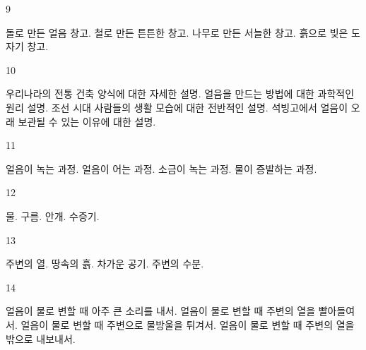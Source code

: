 \documentclass[fs9,seriesFre]{korfarm-base}
\begin{document}
\begin{kfSentenceUnit}{9}{}
\begin{kfChoices}
\kfChoice 돌로 만든 얼음 창고.
\kfChoice 철로 만든 튼튼한 창고.
\kfChoice 나무로 만든 서늘한 창고.
\kfChoice 흙으로 빚은 도자기 창고.
\end{kfChoices}
\end{kfSentenceUnit}

\begin{kfSentenceUnit}{10}{}
\begin{kfChoices}
\kfChoice 우리나라의 전통 건축 양식에 대한 자세한 설명.
\kfChoice 얼음을 만드는 방법에 대한 과학적인 원리 설명.
\kfChoice 조선 시대 사람들의 생활 모습에 대한 전반적인 설명.
\kfChoice 석빙고에서 얼음이 오래 보관될 수 있는 이유에 대한 설명.
\end{kfChoices}
\end{kfSentenceUnit}

\begin{kfSentenceUnit}{11}{}
\begin{kfChoices}
\kfChoice 얼음이 녹는 과정.
\kfChoice 얼음이 어는 과정.
\kfChoice 소금이 녹는 과정.
\kfChoice 물이 증발하는 과정.
\end{kfChoices}
\end{kfSentenceUnit}

\begin{kfSentenceUnit}{12}{}
\begin{kfChoices}
\kfChoice 물.
\kfChoice 구름.
\kfChoice 안개.
\kfChoice 수증기.
\end{kfChoices}
\end{kfSentenceUnit}

\begin{kfSentenceUnit}{13}{}
\begin{kfChoices}
\kfChoice 주변의 열.
\kfChoice 땅속의 흙.
\kfChoice 차가운 공기.
\kfChoice 주변의 수분.
\end{kfChoices}
\end{kfSentenceUnit}

\begin{kfSentenceUnit}{14}{}
\begin{kfChoices}
\kfChoice 얼음이 물로 변할 때 아주 큰 소리를 내서.
\kfChoice 얼음이 물로 변할 때 주변의 열을 빨아들여서.
\kfChoice 얼음이 물로 변할 때 주변으로 물방울을 튀겨서.
\kfChoice 얼음이 물로 변할 때 주변의 열을 밖으로 내보내서.
\end{kfChoices}
\end{kfSentenceUnit}
\end{document}

